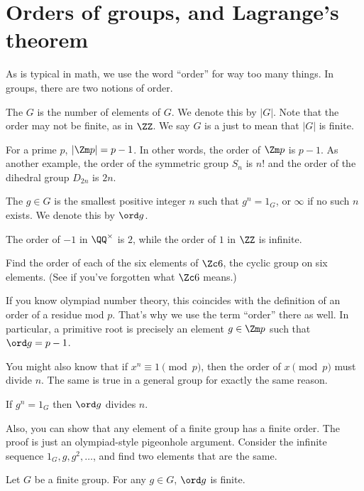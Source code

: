 \section{Orders of groups, and Lagrange's theorem}

As is typical in math, we use the word ``order'' for way too many things.
In groups, there are two notions of order.
\begin{definition}
	The  $G$ is the number of elements of $G$.
	We denote this by $\left\lvert G \right\rvert$.
	Note that the order may not be finite, as in $\ZZ$.
	We say $G$ is a  just to mean that $\left\lvert G \right\rvert$ is finite.
\end{definition}
\begin{example}
	For a prime $p$, $\left\lvert \Zm p \right\rvert = p-1$.
	In other words, the order of $\Zm p$ is $p-1$.
	As another example,
	the order of the symmetric group $S_n$ is $n!$
	and the order of the dihedral group $D_{2n}$ is $2n$.
\end{example}

\begin{definition}
	The  $g \in G$ is the smallest positive integer $n$
	such that $g^n = 1_G$, or $\infty$ if no such $n$ exists.
	We denote this by $\ord g$.
\end{definition}
\begin{example}
	The order of $-1$ in $\QQ^\times$ is $2$,
	while the order of $1$ in $\ZZ$ is infinite.
\end{example}
\begin{ques}
	Find the order of each of the six elements of $\Zc 6$,
	the cyclic group on six elements.
	(See  if you've forgotten what $\Zc 6$ means.)
\end{ques}
\begin{example}
	If you know olympiad number theory, this coincides with the definition of an order of a residue mod $p$.
	That's why we use the term ``order'' there as well.
	In particular, a primitive root is precisely an element $g \in \Zm p$
	such that $\ord g = p-1$.
\end{example}
You might also know that if $x^n \equiv 1 \pmod p$,
then the order of $x \pmod p$ must divide $n$.
The same is true in a general group for exactly the same reason.
\begin{fact}
	If $g^n = 1_G$ then $\ord g$ divides $n$.
\end{fact}
Also, you can show that any element
of a finite group has a finite order.
The proof is just an olympiad-style pigeonhole argument.
Consider the infinite sequence $1_G, g, g^2, \dots$,
and find two elements that are the same.
\begin{fact}
	Let $G$ be a finite group.
	For any $g \in G$, $\ord g$ is finite.
\end{fact}

